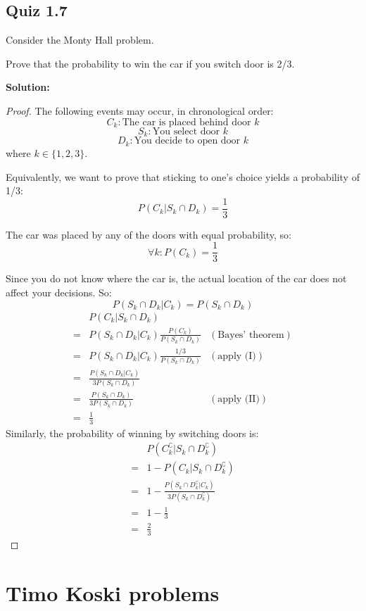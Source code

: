 \documentclass{article}
\begin{document}
\subsection{Quiz 1.7}

Consider the Monty Hall problem.

Prove that the probability to win the car if you switch door is 2/3.

\textbf{Solution:}

\begin{proof}
The following events may occur, in chronological order:
\[C_k: \text{The car is placed behind door }k\]
\[S_k: \text{You select door }k\]
\[D_k: \text{You decide to open door }k\]
where \(k\in \{1,2,3\}\).

Equivalently, we want to prove that sticking to one's choice yields a probability of 1/3:
\[P(C_k|S_k \cap D_k)=\frac{1}{3}\]

The car was placed by any of the doors with equal probability, so:
\[\forall k: P(C_k)=\frac13\tag{I}\]

Since you do not know where the car is, the actual location of the car does not affect your decisions. So:
\[P(S_k\cap D_k|C_k)=P(S_k\cap D_k)\tag{II}\]
\begin{align*}
     & P(C_k|S_k\cap D_k) \\
    =& P(S_k\cap D_k|C_k)\frac{P(C_k)}{P(S_k\cap D_k)} & (\text{Bayes' theorem}) \\
    =& P(S_k\cap D_k|C_k)\frac{1/3}{P(S_k\cap D_k)} & (\text{apply (I)}) \\
    =& \frac{P(S_k\cap D_k|C_k)}{3P(S_k\cap D_k)} \\
    =& \frac{P(S_k\cap D_k)}{3P(S_k\cap D_k)} & (\text{apply (II)}) \\
    =& \frac{1}{3}
\end{align*}
Similarly, the probability of winning by switching doors is:
\begin{align*}
     & P(C_k^\complement|S_k\cap D_k^\complement) \\
    =& 1-P(C_k|S_k\cap D_k^\complement) \\
    =& 1-\frac{P(S_k\cap D_k^\complement|C_k)}{3P(S_k\cap D_k^\complement)} \\
    =& 1-\frac{1}{3} \\
    =& \frac{2}{3}
\end{align*}
\end{proof}

\section{Timo Koski problems}
\end{document}
